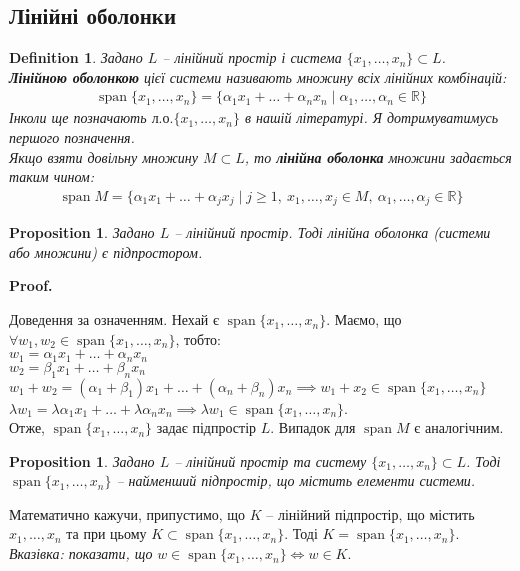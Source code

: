 \documentclass[a4paper, 10pt]{article}
\makeatletter
\theoremstyle{theoremdd}
\newtheorem{definition}[theorem]{Definition}
\newtheorem{proposition}[theorem]{Proposition}
\DeclareMathOperator{\linspan}{span}
\renewenvironment{proof}[1][Proof.\\]{\par
\pushQED{\hfill \qed}%
\normalfont \topsep6\p@\@plus6\p@\relax
\trivlist
\item\relax
{\bfseries
#1\@addpunct{.}}\hspace\labelsep\ignorespaces
}{%
\popQED\endtrivlist\@endpefalse
}
\makeatother
\begin{document}
	\subsection{Лінійні оболонки}
	\begin{definition}
	Задано $L$ -- лінійний простір і система $\{x_1, \dots, x_n\} \subset L$.\\
	\textbf{Лінійною оболонкою} цієї системи називають множину всіх лінійних комбінацій:
	\begin{align*}
	\linspan\{x_1, \dots, x_n\} = \{\alpha_1 x_1 + \dots + \alpha_n x_n \mid \alpha_1, \dots, \alpha_n \in \mathbb{R}\}
	\end{align*}
	Інколи ще позначають $\text{л.о.}\{x_1,\dots,x_n\}$ в нашій літературі. Я дотримуватимусь першого позначення.\\
	Якщо взяти довільну множину $M \subset L$, то \textbf{лінійна оболонка} множини задається таким чином:
	\begin{align*}
	\linspan M = \{\alpha_1 x_1 + \dots + \alpha_j x_j \mid j \geq 1,\ x_1,\dots,x_j \in M,\ \alpha_1, \dots, \alpha_j \in \mathbb{R}\}
	\end{align*}
	\end{definition}
	
	\begin{proposition}
	Задано $L$ -- лінійний простір. Тоді лінійна оболонка (системи або множини) є підпростором.
	\end{proposition}
	
	\begin{proof}
	Доведення за означенням. Нехай є $\linspan\{x_1, \dots, x_n\}$. Маємо, що $\forall w_1, w_2 \in \linspan\{x_1, \dots, x_n\}$, тобто:\\
	$w_1 = \alpha_1 x_1 + \dots + \alpha_n x_n$\\
	$w_2 = \beta_1 x_1 + \dots + \beta_n x_n$\\
	$w_1 + w_2 = (\alpha_1 + \beta_1)x_1 + \dots + (\alpha_n + \beta_n)x_n \implies w_1 + x_2 \in \linspan\{x_1, \dots, x_n\}$\\
	$\lambda w_1 = \lambda \alpha_1 x_1 + \dots + \lambda \alpha_n x_n \implies \lambda w_1 \in \linspan\{x_1, \dots, x_n\}$.\\
	Отже, $\linspan\{x_1, \dots, x_n\}$ задає підпростір $L$. Випадок для $\linspan M$ є аналогічним.
	\end{proof} 
	
	\begin{proposition}
	Задано $L$ -- лінійний простір та систему $\{x_1,\dots,x_n\} \subset L$. Тоді $\linspan \{x_1,\dots,x_n \}$ -- найменший підпростір, що містить елементи системи.
	\end{proposition}
	\noindent
Математично кажучи, припустимо, що $K$ -- лінійний підпростір, що містить $x_1,\dots,x_n$ та при цьому $K \subset \linspan \{x_1,\dots,x_n \}$. Тоді $K = \linspan \{x_1,\dots,x_n \}$.\\
	\textit{Вказівка: показати, що} $w \in \linspan\{x_1,\dots,x_n \} \iff w \in K$.
	
\end{document}
